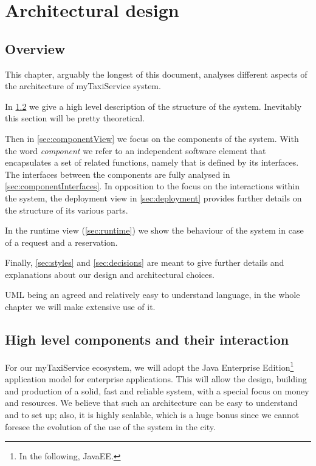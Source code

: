 \chapter{Architectural design} \label{chap:architectural}


\section{Overview}
This chapter, arguably the longest of this document, analyses different aspects of the architecture of myTaxiService system.

In \cref{sec:highlevel} we give a high level description of the structure of the system. Inevitably this section will be pretty theoretical.

Then in \cref{sec:componentView} we focus on the components of the system. With the word \emph{component} we refer to an independent software element that encapsulates a set of related functions, namely that is defined by its interfaces. The interfaces between the components are fully analysed in \cref{sec:componentInterfaces}. In opposition to the focus on the interactions within the system, the deployment view in \cref{sec:deployment} provides further details on the structure of its various parts.

In the runtime view (\cref{sec:runtime}) we show the behaviour of the system in case of a request and a reservation. 

Finally, \cref{sec:styles} and \cref{sec:decisions} are meant to give further details and explanations about our design and architectural choices. %

UML being an agreed and relatively easy to understand language, in the whole chapter we will make extensive use of it.


\section{High level components and their interaction}\label{sec:highlevel}
For our myTaxiService ecosystem, we will adopt the Java Enterprise Edition\footnote{In the following, JavaEE.} application model for enterprise applications. This will allow the design, building and production of a solid, fast and reliable system, with a special focus on money and resources. We believe that such an architecture can be easy to understand and to set up; also, it is highly scalable, which is a huge bonus since we cannot foresee the evolution of the use of the system in the city.

